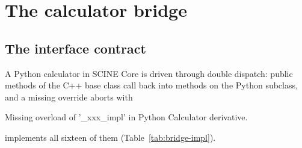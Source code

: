 \section{The calculator bridge}
\label{sec:bridge}

\subsection{The interface contract}

A Python calculator in SCINE Core is driven through double dispatch: public
methods of the C++ base class call back into  methods on the
Python subclass, and a missing override aborts with

\begin{transcript}
Missing overload of '_xxx_impl' in Python Calculator derivative.
\end{transcript}

 implements all sixteen of them
(Table~\ref{tab:bridge-impl}).

